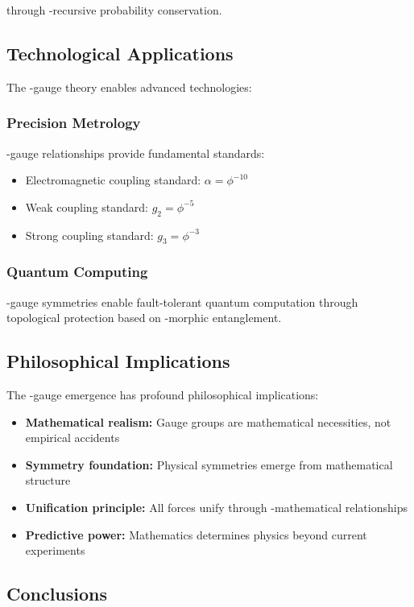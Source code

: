 through \phi-recursive probability conservation.

\subsection{Technological Applications}

The \phi-gauge theory enables advanced technologies:

\subsubsection{Precision Metrology}

\phi-gauge relationships provide fundamental standards:
\begin{itemize}
\item Electromagnetic coupling standard: $\alpha = \phi^{-10}$
\item Weak coupling standard: $g_2 = \phi^{-5}$  
\item Strong coupling standard: $g_3 = \phi^{-3}$
\end{itemize}

\subsubsection{Quantum Computing}

\phi-gauge symmetries enable fault-tolerant quantum computation through topological protection based on \phi-morphic entanglement.

\subsection{Philosophical Implications}

The \phi-gauge emergence has profound philosophical implications:

\begin{itemize}
\item \textbf{Mathematical realism:} Gauge groups are mathematical necessities, not empirical accidents
\item \textbf{Symmetry foundation:} Physical symmetries emerge from mathematical structure
\item \textbf{Unification principle:} All forces unify through \phi-mathematical relationships
\item \textbf{Predictive power:} Mathematics determines physics beyond current experiments
\end{itemize}

\subsection{Conclusions}

